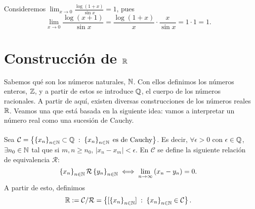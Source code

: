 \begin{eg}
\normalfont Consideremos $\displaystyle \lim_{x \to 0} \frac{\log\left(1+x\right)}{\sin x} = 1 $, pues
\[\lim_{x \to 0}\frac{\log\left(x+1\right)}{\sin x} = \frac{\log\left(1+x\right)}{x} \cdot \frac{x}{\sin x} = 1 \cdot 1 = 1 .\]
\end{eg}

\chapter{Construcción de $\displaystyle \mathbb{R} $}

Sabemos qué son los números naturales, $\displaystyle \mathbb{N} $. Con ellos definimos los números enteros, $\displaystyle \mathbb{Z} $, y a partir de estos se introduce $\displaystyle \mathbb{Q} $, el cuerpo de los números racionales. A partir de aquí, existen diversas construcciones de los números reales $\displaystyle \mathbb{R} $. Veamos una que está basada en la siguiente idea: vamos a interpretar un número real como una sucesión de Cauchy. \\ \\
Sea $\displaystyle \mathcal{C} = \left\{ \left\{ x_{n}\right\} _{n\in\mathbb{N}}\subset\mathbb{Q}\; : \; \left\{ x_{n}\right\} _{n\in\mathbb{N}} \; \text{es de Cauchy}\right\}  $. Es decir, $\displaystyle \forall \epsilon > 0 $  con $\displaystyle \epsilon \in \mathbb{Q} $, $\displaystyle \exists n_{0} \in \mathbb{N} $ tal que si $\displaystyle m, n \geq n_{0} $, $\displaystyle \left|x_{n}-x_{m}\right|<\epsilon  $. En $\displaystyle \mathcal{C} $ se define la siguiente relación de equivalencia $\displaystyle \mathcal{R} $:
\[ \left\{ x_{n}\right\} _{n\in\mathbb{N}} \mathcal{R} \left\{ y_{n}\right\} _{n\in\mathbb{N}} \iff \lim_{n \to \infty}\left(x_{n}-y_{n}\right)= 0 .\]
A partir de esto, definimos 
\[\mathbb{R}:= \mathcal{C}/\mathcal{R} = \left\{ [ \left\{ x_{n}\right\} _{n\in\mathbb{N}}] \; : \; \left\{ x_{n}\right\} _{n\in\mathbb{N}}\in\mathcal{C}\right\}  .\]

